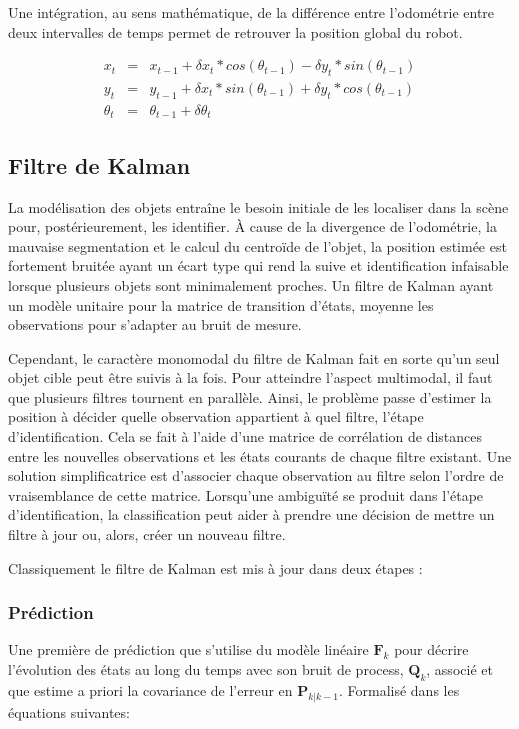 Une intégration, au sens mathématique, de la différence entre
l'odométrie entre deux intervalles de temps permet de retrouver la
position global du robot.

\begin{equation*}
	\begin{array}{rcl}
		x_t &=& x_{t-1} + \delta x_{t} * cos(\theta_{t-1}) - \delta y_{t} * sin(\theta_{t-1}) \\
		y_t &=& y_{t-1} + \delta x_{t} * sin(\theta_{t-1}) + \delta y_{t} * cos(\theta_{t-1}) \\
		\theta_t &=& \theta_{t-1} + \delta\theta_{t}
	\end{array}
\end{equation*}

\subsection{Filtre de Kalman }

La modélisation des objets entraîne le besoin initiale de les
localiser dans la scène pour, postérieurement, les identifier. À cause
de la divergence de l'odométrie, la mauvaise segmentation et le calcul
du centroïde de l'objet, la position estimée est fortement bruitée
ayant un écart type qui rend la suive et identification infaisable
lorsque plusieurs objets sont minimalement proches. Un filtre de
Kalman ayant un modèle unitaire pour la matrice de transition d'états,
moyenne les observations pour s'adapter au bruit de mesure.

Cependant, le caractère monomodal du filtre de Kalman fait en sorte
qu'un seul objet cible peut être suivis à la fois. Pour atteindre
l'aspect multimodal, il faut que plusieurs filtres tournent en
parallèle. Ainsi, le problème passe d’estimer la position à décider
quelle observation appartient à quel filtre, l'étape
d'identification. Cela se fait à l'aide d'une matrice de corrélation
de distances entre les nouvelles observations et les états courants de
chaque filtre existant. Une solution simplificatrice est d'associer
chaque observation au filtre selon l'ordre de vraisemblance de cette
matrice. Lorsqu’une ambiguïté se produit dans l'étape
d'identification, la classification peut aider à prendre une décision
de mettre un filtre à jour ou, alors, créer un nouveau filtre.

Classiquement le filtre de Kalman est mis à jour dans deux étapes : 

\subsubsection{Prédiction} Une première de prédiction que s'utilise du modèle linéaire $\textbf{F}_{k}$ pour décrire l'évolution des états au long du temps avec son bruit de process, $\textbf{Q}_{k}$, associé et que estime a priori la covariance de l'erreur en $\textbf{P}_{k|k-1}$. Formalisé dans les équations suivantes:

